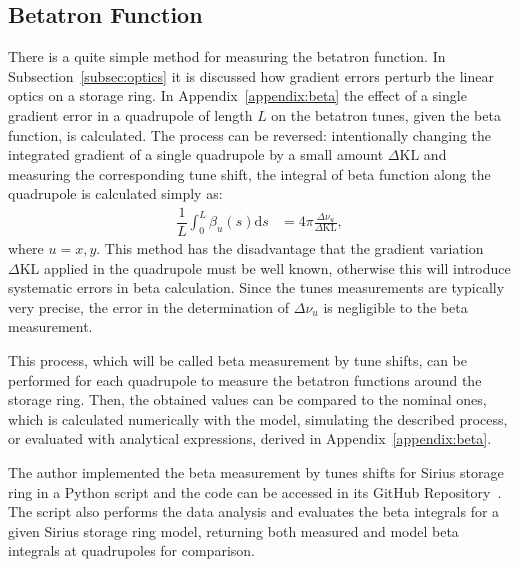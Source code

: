 \subsection{Betatron Function}
There is a quite simple method for measuring the betatron function. In Subsection~\ref{subsec:optics} it is discussed how gradient errors perturb the linear optics on a storage ring. In Appendix~\ref{appendix:beta} the effect of a single gradient error in a quadrupole of length $L$ on the betatron tunes, given the beta function, is calculated. The process can be reversed: intentionally changing the integrated gradient of a single quadrupole by a small amount $\Delta \mathrm{KL}$ and measuring the corresponding tune shift, the integral of beta function along the quadrupole is calculated simply as:
\begin{align}
\dfrac{1}{L}\int_{0}^{L} \beta_u(s) \mathrm{d}s &= 4\pi\frac{\Delta \nu_u}{\Delta \mathrm{KL}},
\end{align}
where $u=x, y$. This method has the disadvantage that the gradient variation $\Delta \mathrm{KL}$ applied in the quadrupole must be well known, otherwise this will introduce systematic errors in beta calculation. Since the tunes measurements are typically very precise, the error in the determination of $\Delta \nu_u$ is negligible to the beta measurement.

This process, which will be called beta measurement by tune shifts, can be performed for each quadrupole to measure the betatron functions around the storage ring. Then, the obtained values can be compared to the nominal ones, which is calculated numerically with the model, simulating the described process, or evaluated with analytical expressions, derived in Appendix~\ref{appendix:beta}.

The author implemented the beta measurement by tunes shifts for Sirius storage ring in a Python script and the code can be accessed in its GitHub Repository~\cite{betasirius}. The script also performs the data analysis and evaluates the beta integrals for a given Sirius storage ring model, returning both measured and model beta integrals at quadrupoles for comparison.

